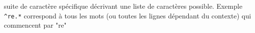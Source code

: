 \newcommand{\w}{\acrshort{omega}}

 {suite de caractère spécifique décrivant une liste de caractères possible. Exemple \lstinline{^re.*} correspond à tous les mots (ou toutes les lignes dépendant du contexte) qui commencent par "re"}



